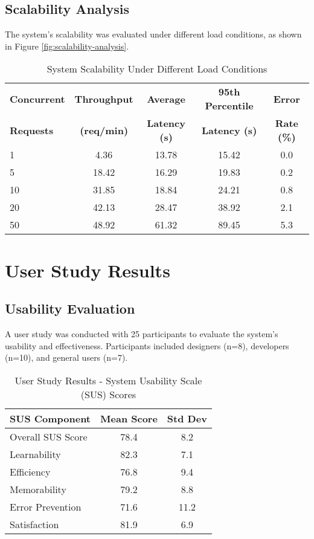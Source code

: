 \subsection{Scalability Analysis}

The system's scalability was evaluated under different load conditions, as shown in Figure \ref{fig:scalability-analysis}.

\begin{table}[h!]
\centering
\caption{System Scalability Under Different Load Conditions}
\label{tab:scalability}
\begin{tabular}{|l|c|c|c|c|}
\hline
\textbf{Concurrent} & \textbf{Throughput} & \textbf{Average} & \textbf{95th Percentile} & \textbf{Error} \\
\textbf{Requests} & \textbf{(req/min)} & \textbf{Latency (s)} & \textbf{Latency (s)} & \textbf{Rate (\%)} \\
\hline
1 & 4.36 & 13.78 & 15.42 & 0.0 \\
5 & 18.42 & 16.29 & 19.83 & 0.2 \\
10 & 31.85 & 18.84 & 24.21 & 0.8 \\
20 & 42.13 & 28.47 & 38.92 & 2.1 \\
50 & 48.92 & 61.32 & 89.45 & 5.3 \\
\hline
\end{tabular}
\end{table}

\section{User Study Results}
\label{sec:user-study}

\subsection{Usability Evaluation}

A user study was conducted with 25 participants to evaluate the system's usability and effectiveness. Participants included designers (n=8), developers (n=10), and general users (n=7).

\begin{table}[h!]
\centering
\caption{User Study Results - System Usability Scale (SUS) Scores}
\label{tab:user-study}
\begin{tabular}{|l|c|c|}
\hline
\textbf{SUS Component} & \textbf{Mean Score} & \textbf{Std Dev} \\
\hline
Overall SUS Score & 78.4 & 8.2 \\
Learnability & 82.3 & 7.1 \\
Efficiency & 76.8 & 9.4 \\
Memorability & 79.2 & 8.8 \\
Error Prevention & 71.6 & 11.2 \\
Satisfaction & 81.9 & 6.9 \\
\hline
\end{tabular}
\end{table}

